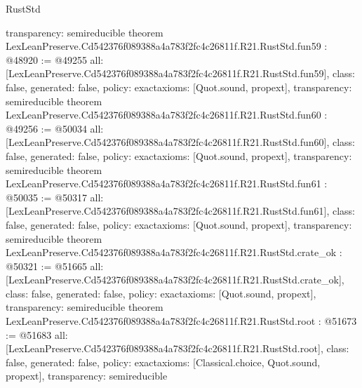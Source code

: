 \begin{lexlean}{RustStd}
\begin{coremodule}
{  transparency: semireducible
}
theorem LexLeanPreserve.Cd542376f089388a4a783f2fc4c26811f.R21.RustStd.fun59 : @48920 := @49255 {
  all: [LexLeanPreserve.Cd542376f089388a4a783f2fc4c26811f.R21.RustStd.fun59],
  class: false,
  generated: false,
  policy: exact{axioms: [Quot.sound, propext]},
  transparency: semireducible
}
theorem LexLeanPreserve.Cd542376f089388a4a783f2fc4c26811f.R21.RustStd.fun60 : @49256 := @50034 {
  all: [LexLeanPreserve.Cd542376f089388a4a783f2fc4c26811f.R21.RustStd.fun60],
  class: false,
  generated: false,
  policy: exact{axioms: [Quot.sound, propext]},
  transparency: semireducible
}
theorem LexLeanPreserve.Cd542376f089388a4a783f2fc4c26811f.R21.RustStd.fun61 : @50035 := @50317 {
  all: [LexLeanPreserve.Cd542376f089388a4a783f2fc4c26811f.R21.RustStd.fun61],
  class: false,
  generated: false,
  policy: exact{axioms: [Quot.sound, propext]},
  transparency: semireducible
}
theorem LexLeanPreserve.Cd542376f089388a4a783f2fc4c26811f.R21.RustStd.crate_ok : @50321 := @51665 {
  all: [LexLeanPreserve.Cd542376f089388a4a783f2fc4c26811f.R21.RustStd.crate_ok],
  class: false,
  generated: false,
  policy: exact{axioms: [Quot.sound, propext]},
  transparency: semireducible
}
theorem LexLeanPreserve.Cd542376f089388a4a783f2fc4c26811f.R21.RustStd.root : @51673 := @51683 {
  all: [LexLeanPreserve.Cd542376f089388a4a783f2fc4c26811f.R21.RustStd.root],
  class: false,
  generated: false,
  policy: exact{axioms: [Classical.choice, Quot.sound, propext]},
  transparency: semireducible
}


\end{coremodule}
\end{lexlean}
